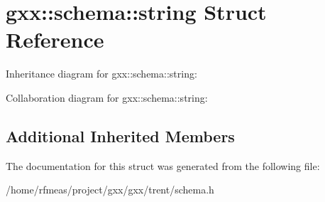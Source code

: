 \hypertarget{structgxx_1_1schema_1_1string}{}\section{gxx\+:\+:schema\+:\+:string Struct Reference}
\label{structgxx_1_1schema_1_1string}


Inheritance diagram for gxx\+:\+:schema\+:\+:string\+:


Collaboration diagram for gxx\+:\+:schema\+:\+:string\+:
\subsection*{Additional Inherited Members}


The documentation for this struct was generated from the following file\+:\begin{DoxyCompactItemize}
\item 
/home/rfmeas/project/gxx/gxx/trent/schema.\+h\end{DoxyCompactItemize}
